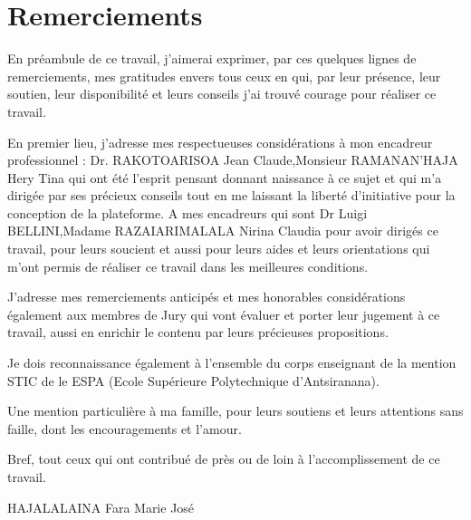 \chapter*{Remerciements}


{\setlength{\baselineskip}{1.5\baselineskip}


En préambule de ce travail, j'aimerai exprimer, par ces quelques lignes de remerciements,
mes gratitudes envers tous ceux en qui, par leur présence, leur soutien, leur disponibilité
et leurs conseils j'ai trouvé courage pour réaliser ce travail.
\bigskip

En premier lieu, j'adresse mes respectueuses considérations à mon encadreur
professionnel : Dr. RAKOTOARISOA Jean Claude,Monsieur RAMANAN'HAJA Hery Tina qui ont été l'esprit pensant donnant
naissance à ce sujet et qui m'a dirigée par ses précieux conseils tout en me laissant la
liberté d'initiative pour la conception de la plateforme. A mes encadreurs qui sont Dr Luigi BELLINI,Madame	RAZAIARIMALALA Nirina Claudia
pour avoir dirigés ce travail, pour leurs soucient et aussi pour leurs aides et leurs
orientations qui m'ont permis de réaliser ce travail dans les meilleures conditions.
\bigskip

J'adresse mes remerciements anticipés et mes honorables considérations également aux
membres de Jury qui vont évaluer et porter leur jugement à ce travail, aussi en enrichir le
contenu par leurs précieuses propositions.
\bigskip

Je dois reconnaissance également à l'ensemble du corps enseignant de la mention STIC
de le ESPA (Ecole Supérieure Polytechnique d'Antsiranana).
\bigskip

Une mention particulière à ma famille, pour leurs soutiens et leurs attentions sans faille,
dont les encouragements et l'amour.
\bigskip

Bref, tout ceux qui ont contribué de près ou de loin à l'accomplissement de ce travail.

\null\hfill HAJALALAINA Fara Marie José


\par}


